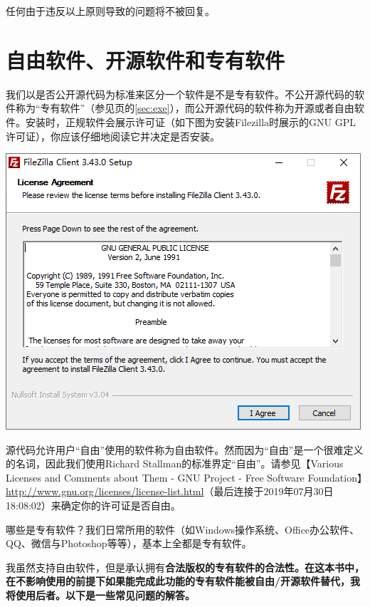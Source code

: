 任何由于违反以上原则导致的问题将不被回复。
\section{自由软件、开源软件和专有软件}
我们以是否公开源代码为标准来区分一个软件是不是专有软件。不公开源代码的软件称为“专有软件”（参见\pageref{sec:exe}页的\ref{sec:exe}），而公开源代码的软件称为开源或者自由软件。安装时，正规软件会展示许可证（如下图为安装Filezilla时展示的GNU GPL许可证），你应该仔细地阅读它并决定是否安装。
\begin{center}
	\includegraphics[scale=0.3]{pic/fzi}
\end{center}\par
源代码允许用户“自由”使用的软件称为自由软件。然而因为“自由”是一个很难定义的名词，因此我们使用Richard Stallman的标准界定“自由”。请参见【Various Licenses and Comments about Them - GNU Project - Free Software Foundation】\url{http://www.gnu.org/licenses/license-list.html}（最后连接于2019年07月30日18:08:02）来确定你的许可证是否自由。\par
哪些是专有软件？我们日常所用的软件（如Windows操作系统、Office办公软件、QQ、微信与Photoshop等等），基本上全都是专有软件。\par
我虽然支持自由软件，但是承认拥有\bf 合法版权\normalall 的专有软件的合法性。在这本书中，在\bf 不影响使用\normalall 的前提下如果能完成此功能的专有软件能被自由/开源软件替代，我将使用后者。以下是一些常见问题的解答。
